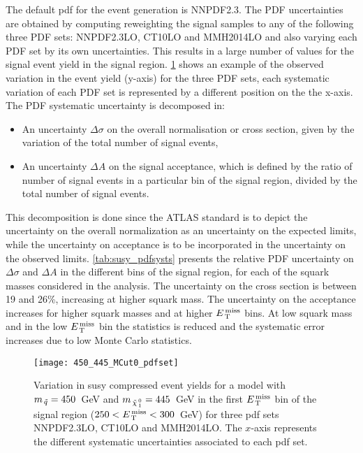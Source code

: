 The default \gls{pdf} for the event generation is NNPDF2.3. The PDF
uncertainties are obtained by computing reweighting the signal samples to any of
the following three PDF sets: NNPDF2.3LO, CT10LO and MMH2014LO and also varying
each PDF set by its own uncertainties. This results in a large number of values
for the signal event yield in the signal
region. \cref{fig:susy_pdfsysts} shows an example of the observed
variation in the event yield (y-axis) for the three PDF sets, each systematic
variation of each PDF set is represented by a different position on the the
x-axis. The PDF systematic uncertainty is decomposed in:
\begin{itemize}
\item An uncertainty $\Delta \sigma$ on the overall normalisation or cross
  section, given by the variation of the total number of signal events,
\item An uncertainty $\Delta A$ on the signal acceptance, which is defined by
  the ratio of number of signal events in a particular bin of the signal region,
  divided by the total number of signal events.
\end{itemize}
This decomposition is done since the ATLAS standard is to depict the uncertainty
on the overall normalization as an uncertainty on the expected limits, while the
uncertainty on acceptance is to be incorporated in the uncertainty on the
observed limits. \cref{tab:susy_pdfsysts} presents the relative PDF uncertainty
on $\Delta \sigma$ and $\Delta A$ in the different bins of the signal region,
for each of the squark masses considered in the analysis. The uncertainty on the
cross section is between 19 and 26\%, increasing at higher squark mass. The
uncertainty on the acceptance increases for higher squark masses and at higher
$E_\mathrm{\, T}^\mathrm{\, miss}$ bins. At low squark mass and in the low $E_\mathrm{\, T}^\mathrm{\, miss}$ bin the statistics is
reduced and the systematic error increases due to low Monte Carlo statistics.
\begin{figure}[hb]
\centering
\texttt{[image: 450\_445\_MCut0\_pdfset]}
\caption{Variation in \gls{susy} compressed event yields for a model with
  $m_{\, \tilde{q}} = 450$~GeV and $m_{\, \tilde{\chi}_{\, 1}^{\, 0}} = 445$~GeV in the first $E_\mathrm{\, T}^\mathrm{\, miss}$ bin of
  the signal region ($250 < E_\mathrm{\, T}^\mathrm{\, miss} < 300$~GeV) for three \gls{pdf} sets
  NNPDF2.3LO, CT10LO and MMH2014LO. The $x$-axis represents the different
  systematic uncertainties associated to each \gls{pdf} set.}
\label{fig:susy_pdfsysts}
\end{figure}

